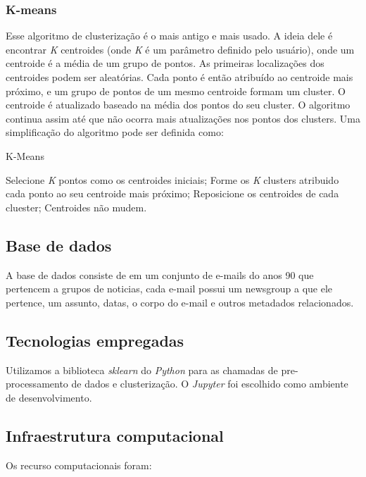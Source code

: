 \documentclass[conference]{IEEEtran}
\begin{document}
\subsubsection{K-means}
Esse algoritmo de clusterização é o mais antigo e mais usado. A ideia dele é encontrar \textit{K} centroides (onde \textit{K} é um parâmetro definido pelo usuário), onde um centroide é a média de um grupo de pontos. As primeiras localizações dos centroides podem ser aleatórias. Cada ponto é então atribuído ao centroide mais próximo, e um grupo de pontos de um mesmo centroide formam um cluster. O centroide é atualizado baseado na média dos pontos do seu cluster. O algoritmo continua assim até que não ocorra mais atualizações nos pontos dos clusters\cite{b3}. Uma simplificação do algoritmo pode ser definida como:
\linebreak

\begin{algorithm}
\caption{K-Means}
\begin{algorithmic}[1]
\STATE Selecione \textit{K} pontos como os centroides iniciais;
\REPEAT
	\STATE Forme os \textit{K} clusters atribuido cada ponto ao seu centroide mais próximo;
	\STATE Reposicione os centroides de cada cluester;
\UNTIL Centroides não mudem.
\end{algorithmic}
\end{algorithm}

 
\subsection{Base de dados}
A base de dados consiste de em um conjunto de e-mails do anos 90 que pertencem a grupos de noticias, cada e-mail possui um newsgroup a que ele pertence, um assunto, datas, o corpo do e-mail e outros metadados relacionados. \cite{b4}

\subsection{Tecnologias empregadas}
Utilizamos a biblioteca \textit{sklearn}\cite{b5} do \textit{Python} para as chamadas de pre-processamento de dados e clusterização. O \textit{Jupyter} foi escolhido como ambiente de desenvolvimento.

\subsection{Infraestrutura computacional}
Os recurso computacionais foram:
\end{document}

